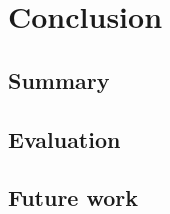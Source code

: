 \chapter{Conclusion}
\label{chp:Conclusion} 

\section{Summary}

\section{Evaluation}

\section{Future work}